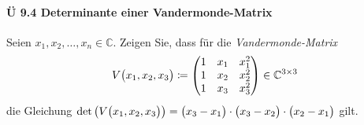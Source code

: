 \documentclass{scrreprt}
\begin{document}
\paragraph{Ü 9.4 Determinante einer Vandermonde-Matrix}

Seien $x_1, x_2, \ldots, x_n \in \mathbb{C}$.
Zeigen Sie, dass für die \emph{Vandermonde-Matrix}
\[
  V\qty\big(x_1, x_2, x_3) \coloneqq \begin{pmatrix}
    1 & x_1 & x_1^2 \\
    1 & x_2 & x_2^2 \\
    1 & x_3 & x_3^2 \\
  \end{pmatrix} \in \mathbb{C}^{3 \times 3}
\]
die Gleichung $\det\qty(V\qty\big(x_1, x_2, x_3)) = \qty\big(x_3 - x_1) \cdot
\qty\big(x_3 - x_2) \cdot \qty\big(x_2 - x_1)$ gilt.
\end{document}

